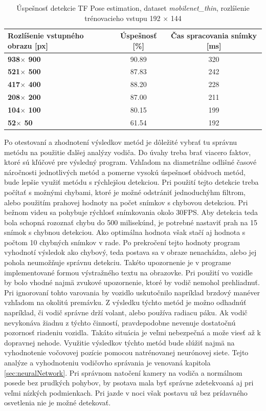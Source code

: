 \documentclass[slovak,master,dept460,male,cpp,cpdeclaration]{diploma}
\begin{document}
\begin{table}[H]
\begin{tabular}{|l|c|c|}
\hline
\textbf{Rozlíšenie vstupného obrazu [px]}        & \textbf{Úspešnosť [\%]}  & \textbf{Čas spracovania snímky [ms]} \\ \hline
\textbf{938$\times$ 900}      & 90.89     &  320       \\ \hline
\textbf{521$\times$ 500}      & 87.83     &  242    \\ \hline
\textbf{417$\times$ 400}      & 88.20     &  228    \\ \hline
\textbf{208$\times$ 200}      & 87.00     &  211   \\ \hline
\textbf{104$\times$ 100}      & 80.15     &  199       \\ \hline
\textbf{52$\times$  50}       & 61.54    &  192       \\ \hline
\end{tabular}

	\caption{Úspešnosť detekcie TF Pose estimation, dataset \textit{mobilenet\_thin}, rozlíšenie trénovacieho vstupu 192 $\times$ 144}
	\label{tab:tf3}
\end{table}

Po otestovaní a zhodnotení  výsledkov metód  je dôležité vybrať tu správnu metódu na  použitie ďalšej analýzy vodiča. Do úvahy treba brať viacero faktov, ktoré sú kľúčové pre výsledný program. Vzhľadom na diametrálne odlišné časové náročnosti jednotlivých metód a pomerne vysokú úspešnosť obidvoch metód, bude lepšie využiť metódu s rýchlejšou detekciou. Pri použití tejto detekcie treba počítať s možnými chybami, ktoré je možné odstrániť jednoduchýhm filtrom, alebo použitím  prahovej hodnoty na počet snímkov s chybovou detekciou. Pri bežnom videu sa pohybuje rýchlosť snímkovania okolo 30FPS. Aby detekcia teda  bola schopná rozoznať chybu do 500 milisekúnd, je potrebné nastaviť prah na 15 snímok s chybnou detekciou. Ako optimálna hodnota však stačí aj hodnota s počtom 10 chybných snímkov v rade. Po prekročení tejto hodnoty program vyhodnotí výsledok ako chybový, teda postava sa v obraze nenachádza, alebo jej pohola neumožňuje správnu detekciu. Takéto upozornenie je v programe  implementované formou výstražného textu na obrazovke. Pri použití vo vozidle by bolo vhodné najmä zvukové upozornenie, ktoré by vodič nemohol prehliadnuť.  Pri ignorovaní tohto varovania by vozidlo uskutočnilo napríklad brzdový  manéver  vzhľadom na okolitú premávku. Z výsledku týchto metód je možno odhadnúť napríklad, či vodič správne drží volant, alebo používa radiacu páku. Ak  vodič nevykonáva žiadnu z týchto činností, pravdepodobne nevenuje dostatočnú pozornosť riadeniu vozidla. Takáto situácia je veľmi nebezpečná a može viesť až k dopravnej nehode. Využitie výsledkov týchto metód bude slúžiť najmä na  vyhodnotenie vočovovej pozície pomocou natrénovanej neurónovej siete. Tejto analýze a vyhodnoteniu  vodičovho správania je venovaná kapitola \ref{sec:neuralNetwork}. Pri správnom natočení kamery na vodiča a normálnom posede bez prudkých pohybov, by psotava mala byť správne zdetekvoaná aj pri veľmi nízkých podmienkach. Pri jazde v noci však postavu už bez prídavného  osvetlenia nie je možné detekovať.
 
\end{document}
